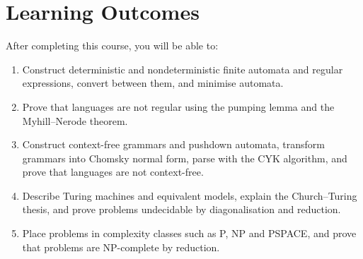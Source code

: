 \documentclass[11pt,a4paper]{article}
\begin{document}
\section{Learning Outcomes}
After completing this course, you will be able to:
\begin{enumerate}[label=LO\arabic*.]
  \item Construct deterministic and nondeterministic finite automata and regular expressions, convert between them, and minimise automata.
  \item Prove that languages are not regular using the pumping lemma and the Myhill--Nerode theorem.
  \item Construct context-free grammars and pushdown automata, transform grammars into Chomsky normal form, parse with the CYK algorithm, and prove that languages are not context-free.
  \item Describe Turing machines and equivalent models, explain the Church--Turing thesis, and prove problems undecidable by diagonalisation and reduction.
  \item Place problems in complexity classes such as P, NP and PSPACE, and prove that problems are NP-complete by reduction.
\end{enumerate}
\end{document}
